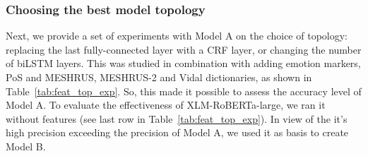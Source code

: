 \documentclass[a4paper,fleqn,longmktitle]{cas-dc}
\begin{document}
    \subsubsection{Choosing the best model topology}
    Next, we provide a set of experiments with Model A on the choice of topology: replacing the last fully-connected layer with a CRF layer, or changing the number of biLSTM layers. This was studied in combination with adding emotion markers, PoS and MESHRUS, MESHRUS-2 and Vidal dictionaries, as shown in Table~\ref{tab:feat_top_exp}. So, this made it possible to assess the accuracy level of Model A. To evaluate the effectiveness of XLM-RoBERTa-large, we ran it without features (see last row in Table~\ref{tab:feat_top_exp}). In view of the it's high precision exceeding the precision of Model A, we used it as basis to  create Model B.    



%
%
\end{document}
